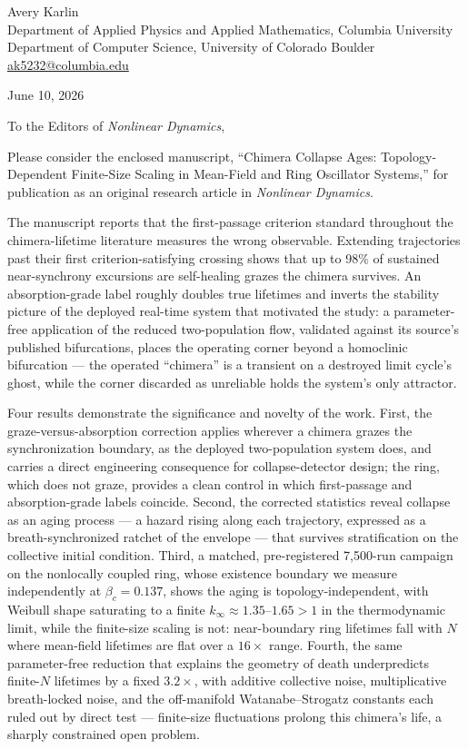 \documentclass[11pt]{article}
\begin{document}
Avery Karlin\\
Department of Applied Physics and Applied Mathematics, Columbia University\\
Department of Computer Science, University of Colorado Boulder\\
\href{mailto:ak5232@columbia.edu}{ak5232@columbia.edu}

June 10, 2026

To the Editors of \emph{Nonlinear Dynamics},

Please consider the enclosed manuscript, ``Chimera Collapse Ages: Topology-Dependent Finite-Size Scaling in Mean-Field and Ring Oscillator Systems,'' for publication as an original research article in \emph{Nonlinear Dynamics}.

The manuscript reports that the first-passage criterion standard throughout the chimera-lifetime literature measures the wrong observable. Extending trajectories past their first criterion-satisfying crossing shows that up to 98\% of sustained near-synchrony excursions are self-healing grazes the chimera survives. An absorption-grade label roughly doubles true lifetimes and inverts the stability picture of the deployed real-time system that motivated the study: a parameter-free application of the reduced two-population flow, validated against its source's published bifurcations, places the operating corner beyond a homoclinic bifurcation --- the operated ``chimera'' is a transient on a destroyed limit cycle's ghost, while the corner discarded as unreliable holds the system's only attractor.

Four results demonstrate the significance and novelty of the work. First, the graze-versus-absorption correction applies wherever a chimera grazes the synchronization boundary, as the deployed two-population system does, and carries a direct engineering consequence for collapse-detector design; the ring, which does not graze, provides a clean control in which first-passage and absorption-grade labels coincide. Second, the corrected statistics reveal collapse as an aging process --- a hazard rising along each trajectory, expressed as a breath-synchronized ratchet of the envelope --- that survives stratification on the collective initial condition. Third, a matched, pre-registered 7,500-run campaign on the nonlocally coupled ring, whose existence boundary we measure independently at $\beta_c = 0.137$, shows the aging is topology-independent, with Weibull shape saturating to a finite $k_\infty \approx 1.35$--$1.65 > 1$ in the thermodynamic limit, while the finite-size scaling is not: near-boundary ring lifetimes fall with $N$ where mean-field lifetimes are flat over a $16\times$ range. Fourth, the same parameter-free reduction that explains the geometry of death underpredicts finite-$N$ lifetimes by a fixed $3.2\times$, with additive collective noise, multiplicative breath-locked noise, and the off-manifold Watanabe--Strogatz constants each ruled out by direct test --- finite-size fluctuations prolong this chimera's life, a sharply constrained open problem.
\end{document}
